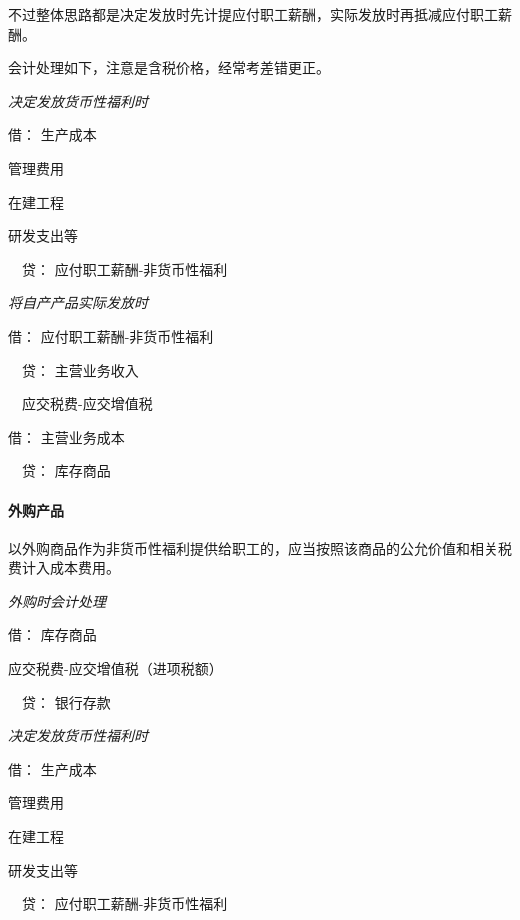 \documentclass[UTF8,12pt]{ctexart}
\newenvironment{Dr}{\noindent 借：}{\par}
\newenvironment{Cr}{\noindent \ \ 贷：}{\par}
\numberwithin{equation}{section} %
\numberwithin{figure}{section}
\numberwithin{table}{section}
\begin{document}
	不过整体思路都是决定发放时先计提应付职工薪酬，实际发放时再抵减应付职工薪酬。
	
	会计处理如下，注意是含税价格，经常考差错更正。
	
	\textit{决定发放货币性福利时}
	
	\begin{Dr}
		生产成本
		
		管理费用
		
		在建工程
		
		研发支出等
	\end{Dr}
	\begin{Cr}
		应付职工薪酬-非货币性福利
	\end{Cr}
	
	\textit{将自产产品实际发放时}
	
	\begin{Dr}
		应付职工薪酬-非货币性福利
	\end{Dr}
	\begin{Cr}
		主营业务收入
		
		\ \ 应交税费-应交增值税
	\end{Cr}

	\begin{Dr}
		主营业务成本
	\end{Dr}
	\begin{Cr}
		库存商品
	\end{Cr}

	\paragraph{外购产品}
	以外购商品作为非货币性福利提供给职工的，应当按照该商品的公允价值和相关税费计入成本费用。
	
	\textit{外购时会计处理}
	
	\begin{Dr}
		库存商品
		
		应交税费-应交增值税（进项税额）
	\end{Dr}
	\begin{Cr}
		银行存款
	\end{Cr}
	
	\textit{决定发放货币性福利时}
	
	\begin{Dr}
		生产成本
		
		管理费用
		
		在建工程
		
		研发支出等
	\end{Dr}
	\begin{Cr}
		应付职工薪酬-非货币性福利
	\end{Cr}
\end{document}
